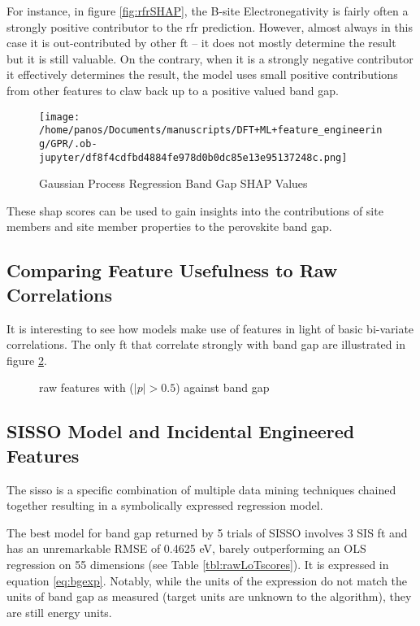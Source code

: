 \documentclass[aip, jmp, amsmath, amssymb, nofootinbib]{revtex4-2}
\begin{document}
For instance, in figure \ref{fig:rfrSHAP}, the B-site Electronegativity
is fairly often a strongly positive contributor to the \acrshort{rfr}
prediction. However, almost always in this case it is out-contributed
by other \gls{ft} -- it does not mostly determine the result but it is
still valuable. On the contrary, when it is a strongly negative
contributor it effectively determines the result, the model uses small
positive contributions from other features to claw back up to a
positive valued band gap.

\begin{figure}[htbp]
\centering
\texttt{[image: /home/panos/Documents/manuscripts/DFT+ML+feature\_engineering/GPR/.ob-jupyter/df8f4cdfbd4884fe978d0b0dc85e13e95137248c.png]}
\caption{\label{fig:gprSHAP} Gaussian Process Regression Band Gap SHAP Values}
\end{figure}

These \acrshort{shap} scores can be used to gain insights into the contributions
of site members and site member properties to the perovskite band
gap.

\subsection*{Comparing Feature Usefulness to Raw Correlations}
\label{sec:org19e0416}
It is interesting to see how models make use of features in light of
basic bi-variate correlations. The only \gls{ft} that correlate
strongly with band gap are illustrated in figure \ref{fig:rpear}.

 
\begin{figure}[htbp]
\centering

\caption{\label{fig:rpear} raw features with (\(|p|>0.5\)) against band gap}
\end{figure}

\subsection*{SISSO Model and Incidental Engineered Features}
\label{sec:orgc0fefaa}
The \Acrfull{sisso}
\cite{ouyang-2018-sisso,ghiringhelli-2017-learn-physic} is a specific
combination of multiple data mining techniques chained together
resulting in a symbolically expressed regression model.

The best model for band gap returned by 5 trials of SISSO involves 3
SIS \gls{ft} and has an unremarkable RMSE of 0.4625 eV, barely
outperforming an OLS regression on 55 dimensions (see Table
\ref{tbl:rawLoTscores}). It is expressed in equation
\ref{eq:bgexp}. Notably, while the units of the expression do not match
the units of band gap as measured (target units are unknown to the
algorithm), they are still energy units.
\end{document}
